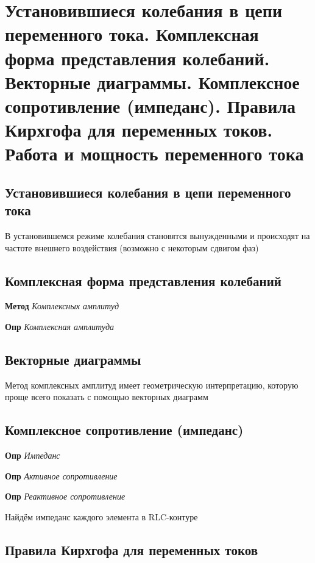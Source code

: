 \documentclass[a4paper, 14pt]{article}
\begin{document}
    \section{Установившиеся колебания в цепи переменного тока.
    Комплексная форма представления колебаний.
    Векторные диаграммы.
    Комплексное сопротивление (импеданс).
    Правила Кирхгофа для переменных токов.
    Работа и мощность переменного тока}
    
    \subsection{Установившиеся колебания в цепи переменного тока}
    
    В установившемся режиме колебания становятся вынужденными и происходят на частоте внешнего воздействия (возможно с
    некоторым сдвигом фаз)
    
    \subsection{Комплексная форма представления колебаний}
    
    \textbf{Метод} \textit{Комплексных амплитуд}
    
    \textbf{Опр} \textit{Комплексная амплитуда}
    
    \subsection{Векторные диаграммы}
    
    Метод комплексных амплитуд имеет геометрическую интерпретацию, которую проще всего показать с помощью векторных
    диаграмм
    
    \subsection{Комплексное сопротивление (импеданс)}
    
    \textbf{Опр} \textit{Импеданс}
    
    \textbf{Опр} \textit{Активное сопротивление}
    
    \textbf{Опр} \textit{Реактивное сопротивление}
    
    Найдём импеданс каждого элемента в RLC-контуре
    
    \subsection{Правила Кирхгофа для переменных токов}
    
\end{document}

